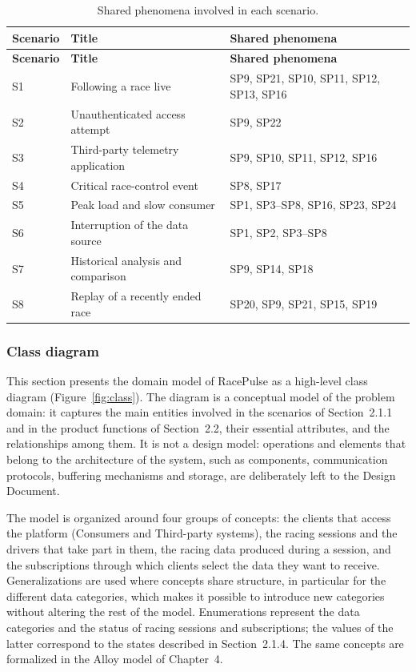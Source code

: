 \documentclass[11pt,a4paper]{article}
\newcommand{\RP}{RacePulse}
\begin{document}
\begin{longtable}{@{}L{1.4cm} L{5.2cm} L{7.5cm}@{}}
\caption{Shared phenomena involved in each scenario.}\label{tab:sc-sp}\\
\toprule \textbf{Scenario} & \textbf{Title} & \textbf{Shared phenomena}\\ \midrule \endfirsthead
\toprule \textbf{Scenario} & \textbf{Title} & \textbf{Shared phenomena}\\ \midrule \endhead
\bottomrule \endfoot
S1 & Following a race live & SP9, SP21, SP10, SP11, SP12, SP13, SP16\\
S2 & Unauthenticated access attempt & SP9, SP22\\
S3 & Third-party telemetry application & SP9, SP10, SP11, SP12, SP16\\
S4 & Critical race-control event & SP8, SP17\\
S5 & Peak load and slow consumer & SP1, SP3--SP8, SP16, SP23, SP24\\
S6 & Interruption of the data source & SP1, SP2, SP3--SP8\\
S7 & Historical analysis and comparison & SP9, SP14, SP18\\
S8 & Replay of a recently ended race & SP20, SP9, SP21, SP15, SP19\\
\end{longtable}

\subsubsection{Class diagram}
This section presents the domain model of \RP{} as a high-level class diagram (Figure~\ref{fig:class}). The
diagram is a conceptual model of the problem domain: it captures the main entities involved in the scenarios of
Section~2.1.1 and in the product functions of Section~2.2, their essential attributes, and the relationships
among them. It is not a design model: operations and elements that belong to the architecture of the system,
such as components, communication protocols, buffering mechanisms and storage, are deliberately left to the
Design Document.

The model is organized around four groups of concepts: the clients that access the platform (Consumers and
Third-party systems), the racing sessions and the drivers that take part in them, the racing data produced
during a session, and the subscriptions through which clients select the data they want to receive.
Generalizations are used where concepts share structure, in particular for the different data categories, which
makes it possible to introduce new categories without altering the rest of the model. Enumerations represent the
data categories and the status of racing sessions and subscriptions; the values of the latter correspond to the
states described in Section~2.1.4. The same concepts are formalized in the Alloy model of Chapter~4.
\end{document}
